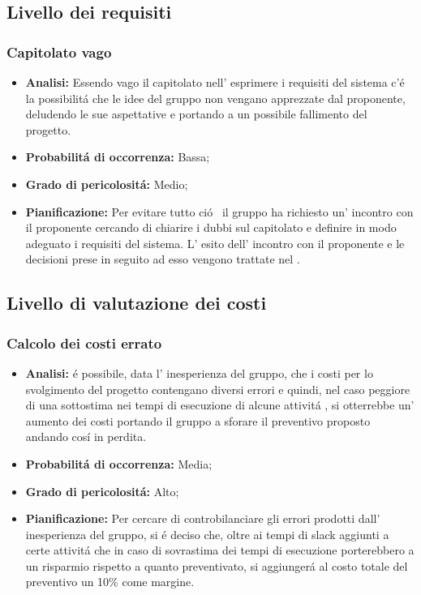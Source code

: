 \subsection{Livello dei requisiti}
\subsubsection{Capitolato vago}
	\begin{itemize}
	\item \textbf{Analisi: }Essendo vago il capitolato nell' esprimere i requisiti del sistema c'\'e la possibilit\'a che le idee del gruppo non vengano apprezzate dal proponente, deludendo le sue aspettative e portando a un possibile fallimento del progetto.
	\item \textbf{Probabilit\'a di occorrenza:} Bassa;
	\item \textbf{Grado di pericolosit\'a:} Medio;
	\item \textbf{Pianificazione: }Per evitare tutto ci\'o~ il gruppo \gruppo ha richiesto un' incontro con il proponente cercando di chiarire i dubbi sul capitolato e definire in modo adeguato i requisiti del sistema. L' esito dell' incontro con il proponente e le decisioni prese in seguito ad esso vengono trattate nel \VerbaleB.
	\end{itemize}
\subsection{Livello di valutazione dei costi}
\subsubsection{Calcolo dei costi errato}
\label{subsubsec:rischiocosti}
	\begin{itemize}
	\item \textbf{Analisi: }\'e possibile, data l' inesperienza del gruppo, che i costi per lo svolgimento del progetto contengano diversi errori e quindi, nel caso peggiore di una sottostima nei tempi di esecuzione di alcune attivit\'a , si otterrebbe un' aumento dei costi portando il gruppo a sforare il preventivo proposto andando cos\'i in perdita.
	\item \textbf{Probabilit\'a di occorrenza:} Media;
	\item \textbf{Grado di pericolosit\'a:} Alto;
	\item \textbf{Pianificazione: } Per cercare di controbilanciare gli errori prodotti dall' inesperienza del gruppo, si \'e deciso che, oltre ai tempi di slack aggiunti a certe  attivit\'a che in caso di sovrastima dei tempi di esecuzione porterebbero a un risparmio rispetto a quanto preventivato, si aggiunger\'a al costo totale del preventivo un 10\% come margine.
	\end{itemize}